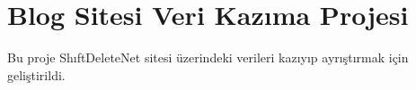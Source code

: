 \chapter{Blog Sitesi Veri Kazıma Projesi}
\hypertarget{md_README}{}\label{md_README}
\label{md_README_autotoc_md0}%
%
Bu proje Shıft\+Delete\+Net sitesi üzerindeki verileri kazıyıp ayrıştırmak için geliştirildi. 